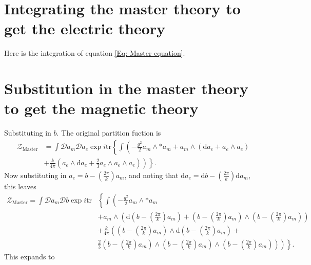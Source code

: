 \documentclass{article}
\begin{document}
\section{Integrating the master theory to get the electric theory}
\label{appendixmagneticintegration}
Here is the integration of equation \eqref{Eq: Master equation}. 


\section{Substitution in the master theory to get the magnetic theory}
\label{appendixelectricsubstitution}
Substituting in $b$. The original partition fuction is
\begin{align}
    \mathcal{Z}_{\text{Master}}&= \int \mathcal{D}a_{m}\mathcal{D}a_{e}\exp i \text{tr}\left\{\int \left(-\frac{g^{2}}{2}a_{m}\wedge * a_{m} \right.\right. + a_{m}\wedge \left(\mathrm{d}a_{e} + a_{e}\wedge a_{e} \right) \nonumber \\
    &+ \left.\left.\frac{k}{4\pi}\left(a_{e}\wedge \mathrm{d}a_{e} + \frac{2}{3}a_{e}\wedge a_{e}\wedge a_{e} \right)\right)\right\}.
\end{align}
Now substituting in $a_{e} = b - \left(\frac{2\pi}{k}\right)a_{m}$, and noting that $\mathrm{d}a_{e} = \mathrm{d}b - \left(\frac{2\pi}{k}\right)\mathrm{d}a_{m}$, this leaves
\begin{align}
    \mathcal{Z}_{\text{Master}}= \int \mathcal{D}a_{m}\mathcal{D}b\exp i \text{tr}&\left\{\int \left(-\frac{g^{2}}{2}a_{m}\wedge * a_{m} \right.\right. \nonumber\\&+ a_{m}\wedge \left(\mathrm{d}\left(b - \left(\frac{2\pi}{k}\right)a_{m}\right) + \left(b - \left(\frac{2\pi}{k}\right)a_{m}\right)\wedge \left(b - \left(\frac{2\pi}{k}\right)a_{m}\right) \right) \nonumber \\
    &+ \frac{k}{4\pi}\left(\left(b - \left(\frac{2\pi}{k}\right)a_{m}\right)\wedge \mathrm{d}\left(b - \left(\frac{2\pi}{k}\right)a_{m}\right)\right. \nonumber+\\& \left.\left.\left.\frac{2}{3}\left(b - \left(\frac{2\pi}{k}\right)a_{m}\right)\wedge \left(b - \left(\frac{2\pi}{k}\right)a_{m}\right)\wedge \left( b - \left(\frac{2\pi}{k}\right)a_{m}\right) \right)\right)\right\}.
\end{align}
This expands to
\end{document}

